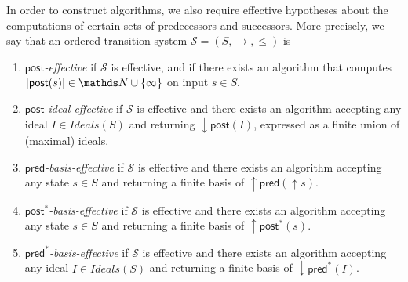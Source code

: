 \documentclass[runningheads]{llncs}
\newcommand{\pred}{\textsf{pred}}
\newcommand{\post}{\textsf{post}}
\begin{document}
In order to construct algorithms, we also require effective hypotheses about the computations of certain sets of predecessors and successors. More precisely, we say that an ordered transition system $\mathscr{S}=(S, \rightarrow, \leq)$ is 
\begin{enumerate}
%
\item {\em $\post$-effective} if $\mathscr{S}$ is effective, and if there
exists an algorithm that computes $|\post(s)| \in \N \cup \{\infty\}$ 
on input $s \in S$.
%
%
\item {\em $\post$-ideal-effective} if $\mathscr{S}$ is effective and there exists an algorithm accepting
any ideal $I \in Ideals(S)$ and returning $\mathop{\downarrow} \post(I)$, expressed as a finite union of (maximal) ideals.
%
\item {\em $\pred$-basis-effective} \cite{DBLP:journals/tcs/FinkelS01,DBLP:journals/iandc/AbdullaCJT00} if $\mathscr{S}$ is effective and there exists an algorithm accepting
any state $s \in S$ and returning a finite basis of $\mathop{\uparrow} \pred(\mathop{\uparrow} s)$.
%
%
\item {\em $\post^*$-basis-effective} \cite{DBLP:conf/gg/Ozkan22,DBLP:journals/corr/abs-2108-00889} if $\mathscr{S}$ is effective and there exists an algorithm accepting
any state $s \in S$ and returning a finite basis of $\mathop{\uparrow} \post^*(s)$.
%
\item {\em $\pred^*$-basis-effective} if $\mathscr{S}$ is effective and there exists an algorithm accepting
any ideal $I \in Ideals(S)$ and returning a finite basis of $\mathop{\downarrow} \pred^*(I)$.
\end{enumerate}
\end{document}
